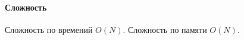 \documentclass[12pt]{article}
\begin{document}
% 
% 






\paragraph{Сложность}
Сложность по времений $ O(N) $.
Сложность по памяти $ O(N) $.
\end{document}
